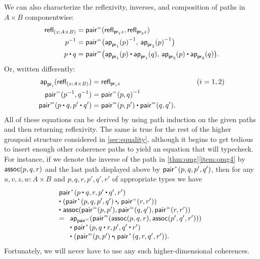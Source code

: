 We can also characterize the reflexivity, inverses, and composition of paths in $A\times B$ componentwise:
\begin{align*}
  {\refl{(z : A \times B)}}
  &= {\pairpath (\refl{\proj{1} z},\refl{\proj{2} z})} \\
  {\opp{p}}
  &= {\pairpath \big(\opp{\projpath{1} (p)},\, \opp{\projpath{2} (p)}\big)} \\
  {{p \ct q}}
  &= {\pairpath \big({\projpath{1} (p)} \ct {\projpath{1} (q)},\,{\projpath{2} (p)} \ct {\projpath{2} (q)}\big)}.
\end{align*}
Or, written differently:
\begin{alignat*}{2}
  \projpath{i}(\refl{(z : A \times B)}) &= \refl{\proj{i} z} &\qquad (i=1,2)\\
  \pairpath(\opp p, \opp q) &= \opp{\pairpath(p,q)}\\
  \pairpath(p\ct q, p'\ct q') &= \pairpath(p,p') \ct \pairpath(q,q').
\end{alignat*}
All of these equations can be derived by using path induction on the given paths and then returning reflexivity.
The same is true for the rest of the higher groupoid structure considered in \cref{sec:equality}, although it begins to get tedious to insert enough other coherence paths to yield an equation that will typecheck.
For instance, if we denote the inverse of the path in \cref{thm:omg}\ref{item:omg4} by $\mathsf{assoc}(p,q,r)$ and the last path displayed above by $\pairct(p,q,p',q')$, then for any $u,v,z,w:A\times B$ and $p,q,r,p',q',r'$ of appropriate types we have
\begin{equation*}
  \begin{array}{l}
    \pairct(p\ct q, r, p'\ct q', r') \\
    \ct\;  (\pairct(p,q,p',q') \rightwhisker \pairpath(r,r')) \\
    \ct\;  \ctassoc(\pairpath(p,p'),\pairpath(q,q'),\pairpath(r,r'))\\
    =
    \begin{array}[t]{l}
      \apfunc{\pairpath}({\pairpath(\ctassoc(p,q,r),\ctassoc(p',q',r'))})\\
      \ct\; \pairct(p, q\ct r, p', q'\ct r')\\
      \ct\; (\pairpath(p,p') \leftwhisker \pairct(q,r,q',r')).
    \end{array}
  \end{array}
\end{equation*}
Fortunately, we will never have to use any such higher-dimensional coherences.

